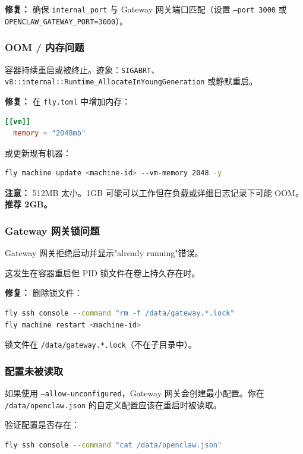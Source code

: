 \textbf{修复：} 确保 \texttt{internal\_port} 与 Gateway 网关端口匹配（设置 \texttt{--port 3000} 或 \texttt{OPENCLAW\_GATEWAY\_PORT=3000}）。

\subsubsection{OOM / 内存问题}


容器持续重启或被终止。迹象：\texttt{SIGABRT}、\texttt{v8::internal::Runtime\_AllocateInYoungGeneration} 或静默重启。

\textbf{修复：} 在 \texttt{fly.toml} 中增加内存：

\begin{lstlisting}[language=toml]
[[vm]]
  memory = "2048mb"
\end{lstlisting}


或更新现有机器：

\begin{lstlisting}[language=bash]
fly machine update <machine-id> --vm-memory 2048 -y
\end{lstlisting}


\textbf{注意：} 512MB 太小。1GB 可能可以工作但在负载或详细日志记录下可能 OOM。\textbf{推荐 2GB。}

\subsubsection{Gateway 网关锁问题}


Gateway 网关拒绝启动并显示"already running"错误。

这发生在容器重启但 PID 锁文件在卷上持久存在时。

\textbf{修复：} 删除锁文件：

\begin{lstlisting}[language=bash]
fly ssh console --command "rm -f /data/gateway.*.lock"
fly machine restart <machine-id>
\end{lstlisting}


锁文件在 \texttt{/data/gateway.*.lock}（不在子目录中）。

\subsubsection{配置未被读取}


如果使用 \texttt{--allow-unconfigured}，Gateway 网关会创建最小配置。你在 \texttt{/data/openclaw.json} 的自定义配置应该在重启时被读取。

验证配置是否存在：

\begin{lstlisting}[language=bash]
fly ssh console --command "cat /data/openclaw.json"
\end{lstlisting}


